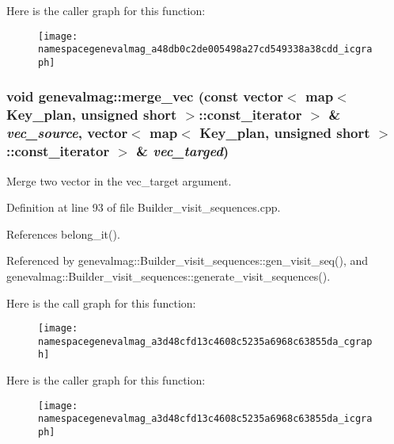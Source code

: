 Here is the caller graph for this function:\nopagebreak
\begin{figure}[H]
\begin{center}
\leavevmode
\texttt{[image: namespacegenevalmag\_a48db0c2de005498a27cd549338a38cdd\_icgraph]}
\end{center}
\end{figure}


\hypertarget{namespacegenevalmag_a3d48cfd13c4608c5235a6968c63855da}{
\subsubsection[{merge\_\-vec}]{\setlength{\rightskip}{0pt plus 5cm}void genevalmag::merge\_\-vec (const vector$<$ map$<$ Key\_\-plan, unsigned short $>$::const\_\-iterator $>$ \& {\em vec\_\-source}, \/  vector$<$ map$<$ Key\_\-plan, unsigned short $>$::const\_\-iterator $>$ \& {\em vec\_\-targed})}}
\label{namespacegenevalmag_a3d48cfd13c4608c5235a6968c63855da}
Merge two vector in the vec\_\-target argument. 

Definition at line 93 of file Builder\_\-visit\_\-sequences.cpp.



References belong\_\-it().



Referenced by genevalmag::Builder\_\-visit\_\-sequences::gen\_\-visit\_\-seq(), and genevalmag::Builder\_\-visit\_\-sequences::generate\_\-visit\_\-sequences().



Here is the call graph for this function:\nopagebreak
\begin{figure}[H]
\begin{center}
\leavevmode
\texttt{[image: namespacegenevalmag\_a3d48cfd13c4608c5235a6968c63855da\_cgraph]}
\end{center}
\end{figure}




Here is the caller graph for this function:\nopagebreak
\begin{figure}[H]
\begin{center}
\leavevmode
\texttt{[image: namespacegenevalmag\_a3d48cfd13c4608c5235a6968c63855da\_icgraph]}
\end{center}
\end{figure}


